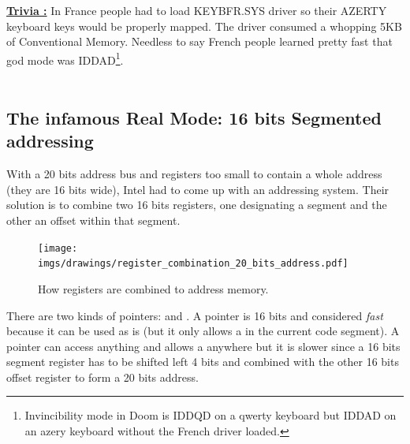 \documentclass[book.tex]{subfiles}
\begin{document}
\bigskip

\textbf{\underline{Trivia :}}  In France people had to load KEYBFR.SYS driver so their AZERTY keyboard keys would be properly mapped. The driver consumed a whopping 5KB of Conventional Memory. Needless to say French people learned pretty fast that god mode was IDDAD\footnote{Invincibility mode in Doom is IDDQD on a qwerty keyboard but IDDAD on an azery keyboard without the French driver loaded.}.\\
\\





\subsection{The infamous Real Mode: 16 bits Segmented addressing}
With a 20 bits address bus and registers too small to contain a whole address (they are 16 bits wide), Intel had to come up with an addressing system. Their solution is to combine two 16 bits registers, one designating a segment and the other an offset within that segment.\\
\par
\begin{figure}[H]
\centering
\texttt{[image: imgs/drawings/register\_combination\_20\_bits\_address.pdf]}
\caption{How registers are combined to address memory.}
\label{fig:register_comb_to_20_bits}
\end{figure}
\par
There are two kinds of pointers:  and . A  pointer is 16 bits and considered \emph{fast} because it can be used as is (but it only allows a  in the current code segment). A  pointer can access anything and allows a  anywhere but it is slower since a 16 bits segment register has to be shifted left 4 bits and combined with the other 16 bits offset register to form a 20 bits address.\\
\end{document}

